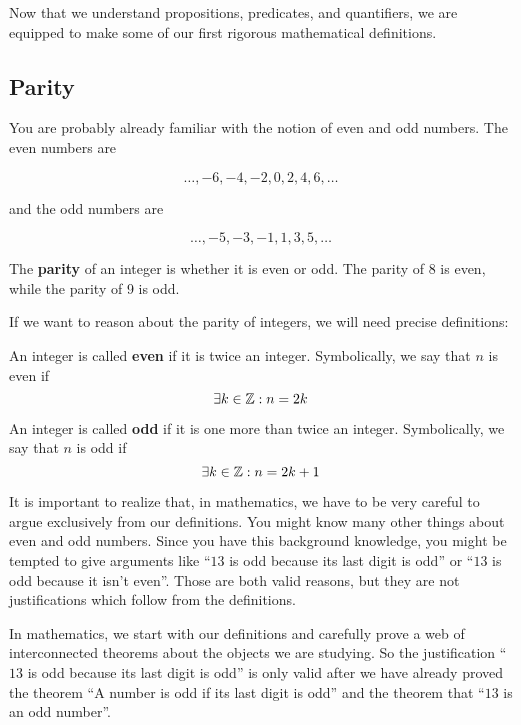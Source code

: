 Now that we understand propositions, predicates, and quantifiers, we are equipped to make some of our first rigorous mathematical definitions.

\subsection{Parity}
You are probably already familiar with the notion of even and odd numbers.   The even numbers are 

$$
\dots, -6, -4, -2, 0 , 2, 4, 6,  \dots
$$

and the odd numbers are 

$$
\dots,  -5, -3, -1, 1, 3, 5, \dots
$$

The \textbf{parity} of an integer is whether it is even or odd.  The parity of 8 is even, while the parity of 9 is odd.

If we want to reason about the parity of integers, we will need precise definitions:

\medskip

\begin{definition}
	
	An integer is called \textbf{even} if it is twice an integer. Symbolically, we say that $n$ is even if $$\exists k \in \mathbb{Z}: n=2k$$
\end{definition}

\begin{definition}
	
	An integer is called \textbf{odd} if it is one more than twice an integer. Symbolically, we say that $n$ is odd if $$\exists k \in \mathbb{Z}: n=2k+1$$
\end{definition}

It is important to realize that, in mathematics, we have to be very careful to argue exclusively from our definitions.  You might know many other things about even and odd numbers.  Since you have this background knowledge, you might be tempted to give arguments like ``$13$ is odd because its last digit is odd'' or ``$13$ is odd because it isn't even''.  Those are both valid reasons, but they are not justifications which follow from the definitions.

In mathematics, we start with our definitions and carefully prove a web of interconnected theorems about the objects we are studying.  So the justification ``$13$ is odd because its last digit is odd'' is only valid after we have already proved the theorem ``A number is odd if its last digit is odd'' and the theorem that ``$13$ is an odd number''.

